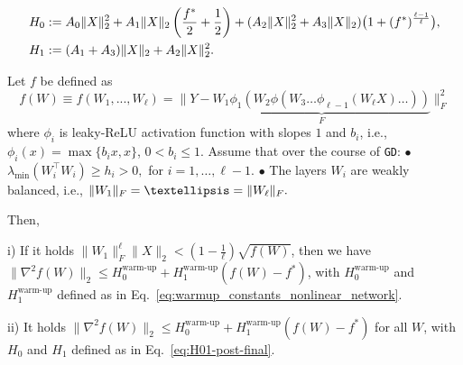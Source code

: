 \documentclass[10pt,a4paper]{amsart}
\DeclarePairedDelimiter{\norm}{\|}{\|}
\newcommand{\algname}[1]{\texttt{#1}}
\begin{document}
\begin{align}
\label{eq:global_constants_linear_network}
 &H_0 :=A_0 \norm{X}_2^2 + A_1 \norm{X}_2 \left(\frac{f^*}{2} + \frac{1}{2}\right) + (A_2 \norm{X}_2^2+A_3 \norm{X}_2)\bigl(1+(f^*)^{\frac{\ell-1}{\ell}}\bigr), \nonumber \\
&H_1 := (A_1 + A_3) \|X\|_2 + A_2 \norm{X}_2^2
.
\end{align}

\begin{proposition}
\label{prop:deep_non_linear_many_nonlinearities}

Let $f$ be defined as
\begin{equation*}
    f(W) \equiv f(W_1,...,W_{\ell}) = \|Y- \underbrace{W_1 \phi_1(W_2 \phi(W_3 \dots \phi_{\ell-1}(W_{\ell} X) \dots ))}_F\|_F^2
\end{equation*}
where $\phi_i$ is leaky-ReLU activation function with slopes $1$ and $b_i$, i.e., $\phi_i(x)=\max \lbrace b_i x,x \rbrace$, $0 < b_i \leq 1$.
Assume that over the course of \algname{GD}:
\newline $\bullet$ $\lambda_{\min}(W_i^\top W_i) \geq h_i >0,$ for $i=1,\dots,\ell-1$.
\newline $\bullet$ The layers $W_i$ are weakly balanced, i.e., $\|W_1\|_{\rm F} = \ldots =\|W_{\ell}\|_{\rm F}.$

Then,

i) If it holds $\|W_1\|_F^{\ell} \|X\|_2 < (1-\frac{1}{\ell}) \sqrt{f(W)}$, then
we have $\|\nabla^2 f(W)\|_2 \leq H_0^{\text{warm-up}} + H_1^{\text{warm-up}} (f(W)-f^*)$, with $H_0^{\text{warm-up}}$ and $H_1^{\text{warm-up}}$ defined as in Eq.~\eqref{eq:warmup_constants_nonlinear_network}.

ii) It holds $\|\nabla^2 f(W)\|_2 \leq H_0^{\text{warm-up}} + H_1^{\text{warm-up}} (f(W)-f^*)$ for all $W$, with $H_0$ and $H_1$ defined as in Eq.~\eqref{eq:H01-post-final}.


    
\end{proposition}
\end{document}
